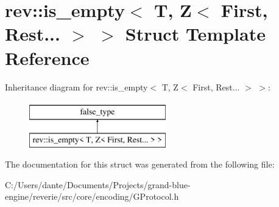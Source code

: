 \hypertarget{structrev_1_1is__empty_3_01_t_00_01_z_3_01_first_00_01_rest_8_8_8_01_4_01_4}{}\section{rev\+::is\+\_\+empty$<$ T, Z$<$ First, Rest... $>$ $>$ Struct Template Reference}
\label{structrev_1_1is__empty_3_01_t_00_01_z_3_01_first_00_01_rest_8_8_8_01_4_01_4}
Inheritance diagram for rev\+::is\+\_\+empty$<$ T, Z$<$ First, Rest... $>$ $>$\+:\begin{figure}[H]
\begin{center}
\leavevmode
\includegraphics[height=2.000000cm]{structrev_1_1is__empty_3_01_t_00_01_z_3_01_first_00_01_rest_8_8_8_01_4_01_4}
\end{center}
\end{figure}


The documentation for this struct was generated from the following file\+:\begin{DoxyCompactItemize}
\item 
C\+:/\+Users/dante/\+Documents/\+Projects/grand-\/blue-\/engine/reverie/src/core/encoding/G\+Protocol.\+h\end{DoxyCompactItemize}
